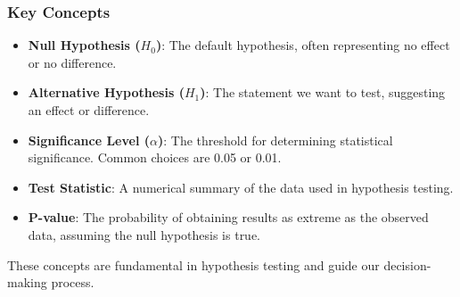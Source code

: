 \documentclass[notes,10pt, aspectratio=169]{beamer}
\begin{document}
\begin{frame}
    \frametitle{Key Concepts}
    
    \begin{itemize}
        \item \textbf{Null Hypothesis ($H_0$)}: The default hypothesis, often representing no effect or no difference.
        
        \item \textbf{Alternative Hypothesis ($H_1$)}: The statement we want to test, suggesting an effect or difference.
        
        \item \textbf{Significance Level ($\alpha$)}: The threshold for determining statistical significance. Common choices are 0.05 or 0.01.
        
        \item \textbf{Test Statistic}: A numerical summary of the data used in hypothesis testing.
        
        \item \textbf{P-value}: The probability of obtaining results as extreme as the observed data, assuming the null hypothesis is true.
    \end{itemize}
    
    These concepts are fundamental in hypothesis testing and guide our decision-making process.
\end{frame}
\end{document}
